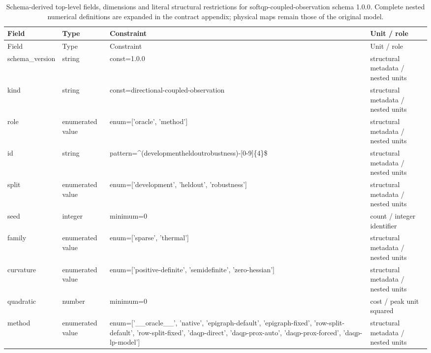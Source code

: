 \begingroup\footnotesize
\begin{longtable}{@{}>{\raggedright\arraybackslash}p{}>{\raggedright\arraybackslash}p{}>{\raggedright\arraybackslash}p{}>{\raggedright\arraybackslash}p{}@{}}
\caption{Schema-derived top-level fields, dimensions and literal structural restrictions for softqp-coupled-observation schema 1.0.0. Complete nested numerical definitions are expanded in the contract appendix; physical maps remain those of the original model.}\label{tab:contract-softqp-coupled-observation}\\
\toprule Field & Type & Constraint & Unit / role\\\midrule\endfirsthead
\toprule Field & Type & Constraint & Unit / role\\\midrule\endhead
\bottomrule\endfoot
schema\_\allowbreak{}version & string & const=\allowbreak{}1.\allowbreak{}0.\allowbreak{}0 & structural metadata /\allowbreak{} nested units\\
kind & string & const=\allowbreak{}directional-\allowbreak{}coupled-\allowbreak{}observation & structural metadata /\allowbreak{} nested units\\
role & enumerated value & enum=\allowbreak{}['oracle', 'method'] & structural metadata /\allowbreak{} nested units\\
id & string & pattern=\allowbreak{}\textasciicircum{}(development\textbar{}\allowbreak{}heldout\textbar{}\allowbreak{}robustness)-[0-9]\{4\}\$ & structural metadata /\allowbreak{} nested units\\
split & enumerated value & enum=\allowbreak{}['development', 'heldout', 'robustness'] & structural metadata /\allowbreak{} nested units\\
seed & integer & minimum=\allowbreak{}0 & count /\allowbreak{} integer identifier\\
family & enumerated value & enum=\allowbreak{}['sparse', 'thermal'] & structural metadata /\allowbreak{} nested units\\
curvature & enumerated value & enum=\allowbreak{}['positive-\allowbreak{}definite', 'semidefinite', 'zero-\allowbreak{}hessian'] & structural metadata /\allowbreak{} nested units\\
quadratic & number & minimum=\allowbreak{}0 & cost /\allowbreak{} peak unit squared\\
method & enumerated value & enum=\allowbreak{}['\_\allowbreak{}\_\allowbreak{}oracle\_\allowbreak{}\_\allowbreak{}', 'native', 'epigraph-\allowbreak{}default', 'epigraph-\allowbreak{}fixed', 'row-\allowbreak{}split-\allowbreak{}default', 'row-\allowbreak{}split-\allowbreak{}fixed', 'daqp-\allowbreak{}direct', 'daqp-\allowbreak{}prox-\allowbreak{}auto', 'daqp-\allowbreak{}prox-\allowbreak{}forced', 'daqp-\allowbreak{}lp-\allowbreak{}model'] & structural metadata /\allowbreak{} nested units\\

\end{longtable}
